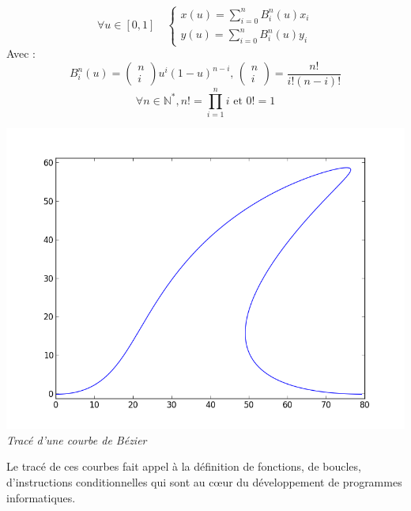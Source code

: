 \documentclass[10pt]{article}
\begin{document}
\begin{minipage}[c]{.45\linewidth}

$$
\forall u \in [0,1] \quad 
\left\{
\begin{array}{l}
x(u)=\sum\limits_{i=0}^{n}B_i^n(u)x_i\\
y(u)=\sum\limits_{i=0}^{n}B_i^n(u)y_i
\end{array}
\right.
$$
Avec :
$$
B_i^n(u)=\left(
\begin{array}{c}
n\\
i
\end{array}\right)u^i\left(1-u \right)^{n-i}
\text{, }
\left(
\begin{array}{c}
n\\
i
\end{array}\right)=\dfrac{n!}{i!(n-i)!}$$
$$
 \forall n\in\mathbb{N^*}, n!=\prod\limits_{i=1}^{n}i \text{ et } 0!=1
 $$


\end{minipage} \hfill
\begin{minipage}[c]{.45\linewidth}
\begin{center}
\includegraphics[width=.9\textwidth]{images/shark.png}
\textit{Tracé d'une courbe de Bézier}
\end{center}
\end{minipage}

\vspace{.5cm}




Le tracé de ces courbes fait appel à la définition de fonctions, de boucles, d'instructions conditionnelles qui sont au c\oe{}ur du développement de programmes informatiques. 
\end{document}

